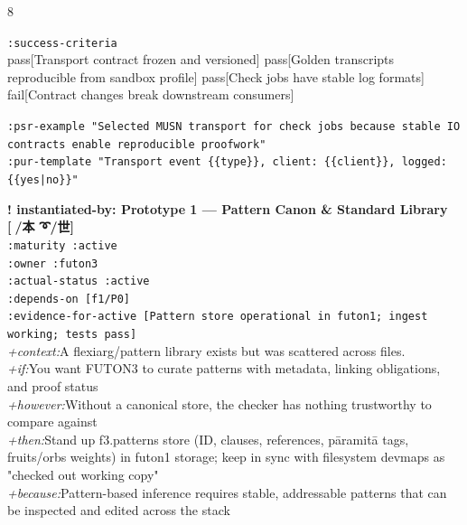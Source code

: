 \documentclass[landscape]{article}
\newcommand{\flexitag}[1]{\textcolor[gray]{0.35}{\textit{#1}}}
\newenvironment{devmapactive}{%
  \def\FrameCommand{\colorbox{devmapactivebg}}%
  \setlength{\fboxsep}{2pt}%
  \MakeFramed{\advance\hsize-\width \FrameRestore}%
}{\endMakeFramed}
\begin{document}
\begin{paracol}{8}
\begin{devmapactive}
\par
  \texttt{:\allowbreak{}success-\allowbreak{}criteria}\\
    pass[Transport contract frozen and versioned] pass[Golden transcripts reproducible from sandbox profile] pass[Check jobs have stable log formats] fail[Contract changes break downstream consumers]\\
\par
  \texttt{:\allowbreak{}psr-\allowbreak{}example "Selected MUSN transport for check jobs because stable IO contracts enable reproducible proofwork"}\\
  \texttt{:\allowbreak{}pur-\allowbreak{}template "Transport event \{\{type\}\},\allowbreak{} client:\allowbreak{} \{\{client\}\},\allowbreak{} logged:\allowbreak{} \{\{yes|\allowbreak{}no\}\}"}\\
\par
\par
\end{devmapactive}
\begin{devmapactive}
\textbf{! instantiated-by: Prototype 1 — Pattern Canon \& Standard Library [🐺/本 ➰/世]}\\
  \texttt{:\allowbreak{}maturity :\allowbreak{}active}\\
  \texttt{:\allowbreak{}owner :\allowbreak{}futon3}\\
  \texttt{:\allowbreak{}actual-\allowbreak{}status :\allowbreak{}active}\\
  \texttt{:\allowbreak{}depends-\allowbreak{}on [f1/\allowbreak{}P0]}\\
  \texttt{:\allowbreak{}evidence-\allowbreak{}for-\allowbreak{}active [Pattern store operational in futon1;\allowbreak{} ingest working;\allowbreak{} tests pass]}\\
  \flexitag{+context:}A flexiarg/pattern library exists but was scattered across files.\\
  \flexitag{+if:}You want FUTON3 to curate patterns with metadata, linking obligations, and proof status\\
  \flexitag{+however:}Without a canonical store, the checker has nothing trustworthy to compare against\\
  \flexitag{+then:}Stand up f3.patterns store (ID, clauses, references, pāramitā tags, fruits/orbs weights) in futon1 storage; keep in sync with filesystem devmaps as "checked out working copy"\\
  \flexitag{+because:}Pattern-based inference requires stable, addressable patterns that can be inspected and edited across the stack\\

\end{devmapactive}
\end{paracol}
\end{document}
